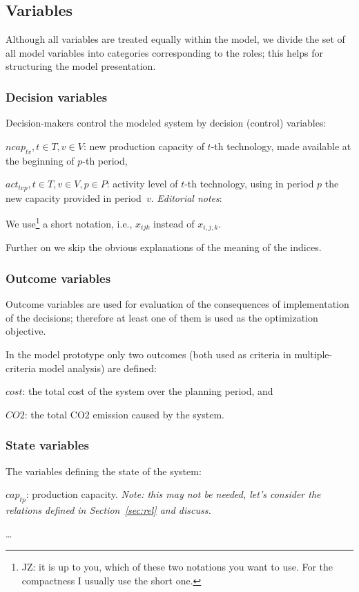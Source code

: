 \documentclass[a4paper,12pt]{article}
\begin{document}
\subsection{Variables}
Although all variables are treated equally within the model,
we divide the set of all model variables into categories corresponding to the roles;
this helps for structuring the model presentation.

\subsubsection{Decision variables}
Decision-makers control the modeled system by decision (control) variables:
\btlb
\item $ncap_{tv}, t \in T, v \in V$: new production capacity of $t$-th
	technology, made available at the beginning of $p$-th period,
\item $act_{tvp}, t \in T, v \in V, p \in P$: activity level of $t$-th
	technology, using in period $p$ the new capacity provided in period~$v$.
\etl
{\em Editorial notes}:
\btlb
\item We use\footnote{JZ: it is up to you, which of these two notations
	you want to use. For the compactness I usually use the short one.}
	a short notation, i.e., $x_{ijk}$ instead of $x_{i,j,k}$.
\item Further on we skip the obvious explanations of the meaning of the
	indices.
\etl

\subsubsection{Outcome variables}
Outcome variables are used for evaluation of the consequences of implementation
of the decisions; therefore at least one of them is used as the optimization
objective.

In the model prototype only two outcomes (both used as criteria in
multiple-criteria model analysis) are defined:
\btlb
\item $cost$: the total cost of the system over the planning period, and
\item $CO2$: the total CO2 emission caused by the system.
\etl

\subsubsection{State variables}
The variables defining the state of the system:
\btlb
\item $cap_{tp}$: production capacity. {\em Note: this may not be needed,
	let's consider the relations defined in Section~\ref{sec:rel} and discuss.}
\item \dots
\etl
\end{document}
